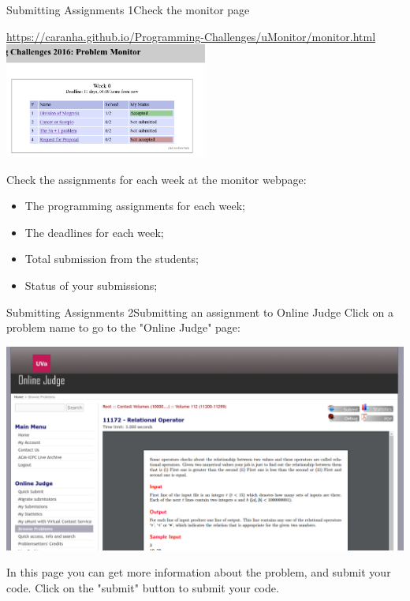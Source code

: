 \begin{frame}{Submitting Assignments 1}{Check the monitor page}
  \begin{center}
    {\tiny
    \url{https://caranha.github.io/Programming-Challenges/uMonitor/monitor.html}}\\
    \includegraphics[width=0.5\textwidth]{img/monitorpage}
  \end{center}
  \bigskip

  Check the assignments for each week at the monitor webpage:

  \begin{itemize}
    \item The programming assignments for each week;
    \item The deadlines for each week;
    \item Total submission from the students;
    \item Status of your submissions;
  \end{itemize}
\end{frame}

\begin{frame}{Submitting Assignments 2}{Submitting an assignment to Online Judge}
  Click on a problem name to go to the "Online Judge" page:
  \begin{center}
    \includegraphics[width=.7\textwidth]{img/relationaloperator}
  \end{center}
  In this page you can get more information about the problem, and submit your code.
  Click on the "submit" button to submit your code.
\end{frame}

